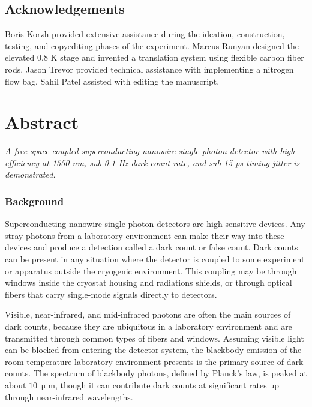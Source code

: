 \documentclass[11pt]{caltech_thesis} %
\begin{document}
\hypertarget{acknowledgements}{%
\subsection{Acknowledgements}\label{acknowledgements}}

Boris Korzh provided extensive assistance during the ideation, construction, testing, and copyediting phases of the experiment. Marcus Runyan designed the elevated 0.8 K stage and invented a translation system using flexible carbon fiber rods. Jason Trevor provided technical assistance with implementing a nitrogen flow bag. Sahil Patel assisted with editing the manuscript.

\hypertarget{abstract}{%
\section{Abstract}\label{abstract}}

\emph{A free-space coupled superconducting nanowire single photon detector with high efficiency at 1550 nm, sub-0.1 Hz dark count rate, and sub-15 ps timing jitter is demonstrated.}

\hypertarget{background}{%
\subsubsection{Background}\label{background}}

Superconducting nanowire single photon detectors are high sensitive devices. Any stray photons from a laboratory environment can make their way into these devices and produce a detection called a dark count or false count. Dark counts can be present in any situation where the detector is coupled to some experiment or apparatus outside the cryogenic environment. This coupling may be through windows inside the cryostat housing and radiations shields, or through optical fibers that carry single-mode signals directly to detectors.

Visible, near-infrared, and mid-infrared photons are often the main sources of dark counts, because they are ubiquitous in a laboratory environment and are transmitted through common types of fibers and windows. Assuming visible light can be blocked from entering the detector system, the blackbody emission of the room temperature laboratory environment presents is the primary source of dark counts. The spectrum of blackbody photons, defined by Planck's law, is peaked at about $10~\mathrm{\upmu m}$, though it can contribute dark counts at significant rates up through near-infrared wavelengths.
\end{document}
